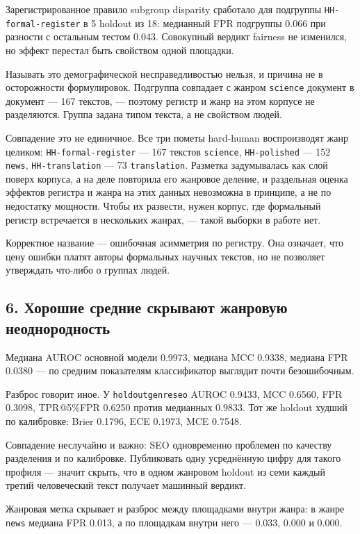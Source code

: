 \documentclass[11pt,a4paper]{article}
\renewcommand{\_}{\textunderscore\allowbreak}
\begin{document}
Зарегистрированное правило subgroup disparity сработало для подгруппы
\texttt{HH-\allowbreak{}formal-\allowbreak{}register} в 5 holdout из 18: медианный FPR подгруппы 0.066 при
разности с остальным тестом 0.043. Совокупный вердикт fairness не изменился, но
эффект перестал быть свойством одной площадки.

Называть это демографической несправедливостью нельзя, и причина не в осторожности
формулировок. Подгруппа совпадает с жанром \texttt{science} документ в документ — 167
текстов, — поэтому регистр и жанр на этом корпусе не разделяются. Группа задана
типом текста, а не свойством людей.

Совпадение это не единичное. Все три пометы hard-human воспроизводят жанр
целиком: \texttt{HH-\allowbreak{}formal-\allowbreak{}register} — 167 текстов \texttt{science}, \texttt{HH-\allowbreak{}polished} — 152 \texttt{news},
\texttt{HH-\allowbreak{}translation} — 73 \texttt{translation}. Разметка задумывалась как слой поверх корпуса,
а на деле повторила его жанровое деление, и раздельная оценка эффектов регистра и
жанра на этих данных невозможна в принципе, а не по недостатку мощности. Чтобы их
развести, нужен корпус, где формальный регистр встречается в нескольких жанрах, —
такой выборки в работе нет.

Корректное название — ошибочная асимметрия по регистру. Она означает, что цену
ошибки платят авторы формальных научных текстов, но не позволяет утверждать
что-либо о группах людей.

\subsection{6. Хорошие средние скрывают жанровую неоднородность}

Медиана AUROC основной модели 0.9973, медиана MCC 0.9338, медиана FPR 0.0380 — по
средним показателям классификатор выглядит почти безошибочным.

Разброс говорит иное. У \texttt{holdout\_genre\_seo} AUROC 0.9433, MCC 0.6560, FPR 0.3098,
TPR@5\%FPR 0.6250 против медианных 0.9833. Тот же holdout худший по калибровке:
Brier 0.1796, ECE 0.1973, MCE 0.7548.

Совпадение неслучайно и важно: SEO одновременно проблемен по качеству разделения
и по калибровке. Публиковать одну усреднённую цифру для такого профиля —
значит скрыть, что в одном жанровом holdout из семи каждый третий человеческий
текст получает машинный вердикт.

Жанровая метка скрывает и разброс между площадками внутри жанра: в жанре
\texttt{news} медиана FPR 0.013, а по площадкам внутри него — 0.033, 0.000 и 0.000.
\end{document}
